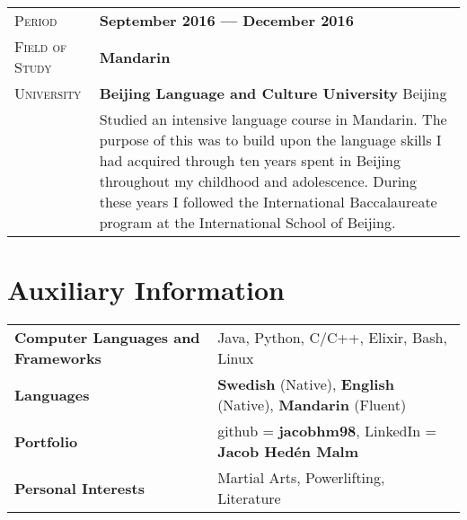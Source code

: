 \documentclass[a4paper, oneside, final]{scrartcl} %
\newcommand{\gray}{\rowcolor[gray]{.90}} %
\begin{document}
\begin{center}
\vspace{12pt}

\begin{tabularx}{0.97\linewidth}{>{\raggedleft\scshape}p{2cm}X}
\gray Period & \textbf{September 2016 ---  December 2016}\\
\gray Field of Study & \textbf{Mandarin}\\
\gray University & \textbf{Beijing Language and Culture University} \hfill Beijing\\
& Studied an intensive language course in Mandarin. The purpose of this was to build upon the language skills I had acquired through ten years spent in Beijing throughout my childhood and adolescence. During these years I followed the International Baccalaureate program at the International School of Beijing.
\end{tabularx}



\section{Auxiliary Information}

\begin{tabular}{ @{} >{\bfseries}l @{\hspace{6ex}} l }
Computer Languages and Frameworks & Java, Python, C/C++, Elixir, Bash, Linux\\
Languages & \textbf{Swedish} (Native), \textbf{English} (Native), \textbf{Mandarin} (Fluent)\\
Portfolio & github = \textbf{jacobhm98},  LinkedIn = \textbf{Jacob Hedén Malm}\\
Personal Interests & Martial Arts, Powerlifting, Literature

\end{tabular}

\end{center}
\end{document}
